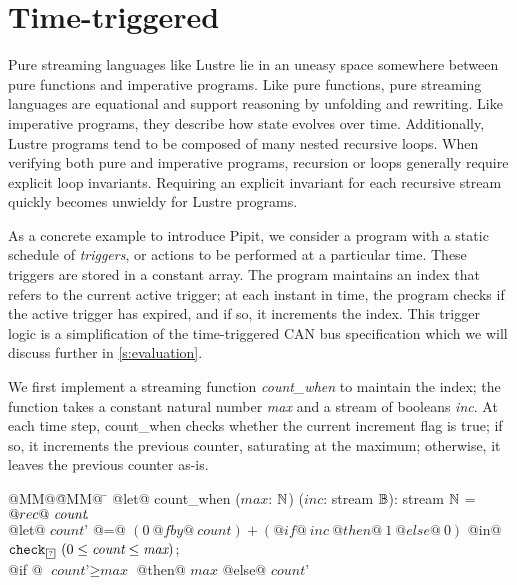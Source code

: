
\section{Time-triggered}
\label{s:motivation}

Pure streaming languages like Lustre lie in an uneasy space somewhere between pure functions and imperative programs.
Like pure functions, pure streaming languages are equational and support reasoning by unfolding and rewriting.
Like imperative programs, they describe how state evolves over time.
Additionally, Lustre programs tend to be composed of many nested recursive loops.
When verifying both pure and imperative programs, recursion or loops generally require explicit loop invariants.
Requiring an explicit invariant for each recursive stream quickly becomes unwieldy for Lustre programs.

As a concrete example to introduce Pipit, we consider a program with a static schedule of \emph{triggers}, or actions to be performed at a particular time.
These triggers are stored in a constant array.
The program maintains an index that refers to the current active trigger; at each instant in time, the program checks if the active trigger has expired, and if so, it increments the index.
This trigger logic is a simplification of the time-triggered CAN bus specification \cite{fuehrer2001time} which we will discuss further in \autoref{s:evaluation}.

We first implement a streaming function \emph{count_when} to maintain the index; the function takes a constant natural number \emph{max} and a stream of booleans \emph{inc}.
At each time step, count_when checks whether the current increment flag is true; if so, it increments the previous counter, saturating at the maximum; otherwise, it leaves the previous counter as-is.

\begin{tabbing}
  @MM@\= @MM@ \= \kill
  @let@ count_when ($\textit{max}$: $\mathbb{N}$) ($\textit{inc}$: stream $\mathbb{B}$): stream $\mathbb{N}$ = \\
    \> $@rec@~\textit{count}\hspace{-0.1em}.~$ \\
    \> \> @let@ $\textit{count'}$ @=@ $(0~@fby@~\textit{count}) + (@if@~\textit{inc}~@then@~1~@else@~0)$ @in@ \\
    \> \> $\xcheckP{\PSUnknown}{(0 \le \textit{count} \le \textit{max})}$; \\
    \> \> @if @ $\textit{count'} \ge \textit{max}$ @then@ $\textit{max}$  @else@ $\textit{count'}$ \\
\end{tabbing}

